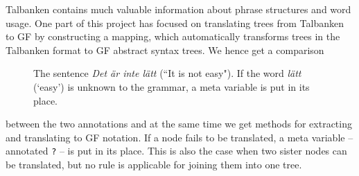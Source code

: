 \documentclass[runningheads,a4paper]{llncs}
\begin{document}
Talbanken contains much valuable information about phrase structures and word 
usage.
One part of this project has focused on translating trees from Talbanken to GF
by constructing a mapping, which automatically transforms trees in the
Talbanken format to GF abstract syntax trees. We hence get a comparison 
\begin{figure}[!h]
\centering
{}
\caption{The sentence \emph{Det är inte lätt} (``It is not easy"). If the word
         \emph{lätt} (`easy') is unknown to the grammar, a meta variable is put
         in its place.}
\label{fig:gftree1}
\vspace{-5mm}
\end{figure}
between the two annotations and at the same time we get methods for extracting
and translating to GF notation. 
If a node fails to be translated, a meta variable  --annotated \verb-?- -- is put in its place.
This is also the case when two sister nodes can be translated, but no rule is
applicable for joining them into one tree.
\end{document}
